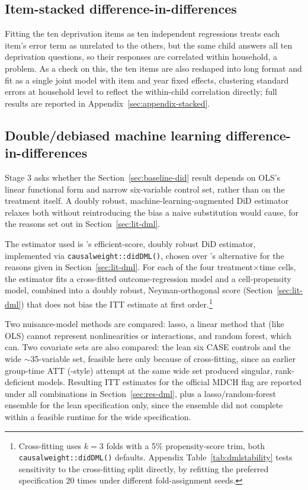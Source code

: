 \subsection{Item-stacked difference-in-differences}
\label{sec:item-stacked}
 
Fitting the ten deprivation items as ten independent regressions treats each item's error term as unrelated to the others, but the same child answers all ten deprivation questions, so their responses are correlated within household, a \citet{moulton1990} problem. As a check on this, the ten items are also reshaped into long format and fit as a single joint model with item and year fixed effects, clustering standard errors at household level to reflect the within-child correlation directly; full results are reported in Appendix~\ref{sec:appendix-stacked}.
 
\subsection{Double/debiased machine learning difference-in-differences}
\label{sec:dml}
 
Stage 3 asks whether the Section~\ref{sec:baseline-did} result depends on OLS's linear functional form and narrow six-variable control set, rather than on the treatment itself. A doubly robust, machine-learning-augmented DiD estimator relaxes both without reintroducing the bias a naive substitution would cause, for the reasons set out in Section~\ref{sec:lit-dml}.
 
The estimator used is \citet{zimmert2020}'s efficient-score, doubly robust DiD estimator, implemented via \texttt{causalweight::didDML()}, chosen over \citet{chang2020}'s alternative for the reasons given in Section~\ref{sec:lit-dml}. For each of the four treatment$\times$time cells, the estimator fits a cross-fitted outcome-regression model and a cell-propensity model, combined into a doubly robust, Neyman-orthogonal score (Section~\ref{sec:lit-dml}) that does not bias the ITT estimate at first order.\footnote{Cross-fitting uses $k=3$ folds with a 5\% propensity-score trim, both \texttt{causalweight::didDML()} defaults. Appendix Table~\ref{tab:dmlstability} tests sensitivity to the cross-fitting split directly, by refitting the preferred specification 20 times under different fold-assignment seeds.}
 
Two nuisance-model methods are compared: lasso, a linear method that (like OLS) cannot represent nonlinearities or interactions, and random forest, which can. Two covariate sets are also compared: the lean six CASE controls and the wide $\sim$35-variable set, feasible here only because of cross-fitting, since an earlier group-time ATT (\citeauthor{callawaysantanna2021}-style) attempt at the same wide set produced singular, rank-deficient models. Resulting ITT estimates for the official MDCH flag are reported under all combinations in Section~\ref{sec:res-dml}, plus a lasso/random-forest ensemble for the lean specification only, since the ensemble did not complete within a feasible runtime for the wide specification.

